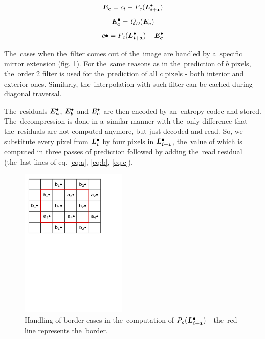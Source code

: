 $$\objnorm{E}{c} = c_t - \opnorm{P}{c}(\ldot{i+1})$$
$$\objdot{E}{c} = \opnorm{Q}{D}(\objnorm{E}{c})$$
\begin{equation}
\label{eq:c}
c\bullet = \opnorm{P}{c}(\ldot{i+1}) + \objdot{E}{c}
\end{equation}

The~cases when the~filter comes out of the~image are handled by a~specific mirror extension (fig. \ref{fig:cborders}). For the~same reasons as in the~prediction of $b$ pixels, the~order 2 filter is used for the~prediction of all $c$ pixels - both interior and exterior ones. Similarly, the~interpolation with such filter can be cached during diagonal traversal.

The~residuals $\objdot{E}{a}$, $\objdot{E}{b}$ and $\objdot{E}{c}$ are then encoded by an~entropy codec and stored. The~decompression is done in a~similar manner with the~only difference that the~residuals  are not computed anymore, but just decoded and read. So, we substitute every pixel from $\ldot{i}$ by four pixels in $\ldot{i+1}$, the~value of which is computed in three passes of prediction followed by adding the~read residual (the~last lines of eq. \ref{eq:a}, \ref{eq:b}, \ref{eq:c}).

\begin{figure}
	\includegraphics[trim={0 17cm 3cm 0}, clip, width=0.45\textwidth]{figures/extc.pdf}\centering
	\caption{Handling of border cases in the~computation of $\opnorm{P}{c}(\ldot{i+1})$ - the~red line represents the~border.}
	\label{fig:cborders}
\end{figure}